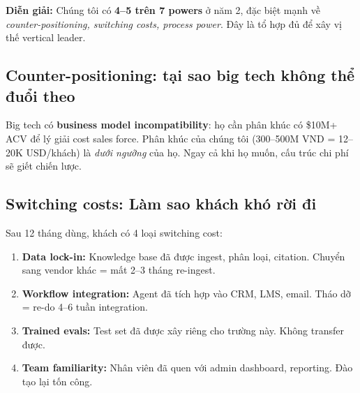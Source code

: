 \documentclass[11pt,a4paper]{article}
\begin{document}
\textbf{Diễn giải:} Chúng tôi có \textbf{4--5 trên 7 powers} ở năm 2, đặc biệt
mạnh về \textit{counter-positioning, switching costs, process power}. Đây là
tổ hợp đủ để xây vị thế vertical leader.

\subsection{Counter-positioning: tại sao big tech không thể đuổi theo}

\begin{center}
\end{center}

Big tech có \textbf{business model incompatibility}: họ cần phân khúc có \$10M+
ACV để lý giải cost sales force. Phân khúc của chúng tôi (300--500M VND = 12--20K
USD/khách) là \textit{dưới ngưỡng} của họ. Ngay cả khi họ muốn, cấu trúc chi
phí sẽ giết chiến lược.

\subsection{Switching costs: Làm sao khách khó rời đi}

Sau 12 tháng dùng, khách có 4 loại switching cost:

\begin{enumerate}
\item \textbf{Data lock-in:} Knowledge base đã được ingest, phân loại, citation. Chuyển sang vendor khác = mất 2--3 tháng re-ingest.
\item \textbf{Workflow integration:} Agent đã tích hợp vào CRM, LMS, email. Tháo dỡ = re-do 4--6 tuần integration.
\item \textbf{Trained evals:} Test set đã được xây riêng cho trường này. Không transfer được.
\item \textbf{Team familiarity:} Nhân viên đã quen với admin dashboard, reporting. Đào tạo lại tốn công.
\end{enumerate}
\end{document}
